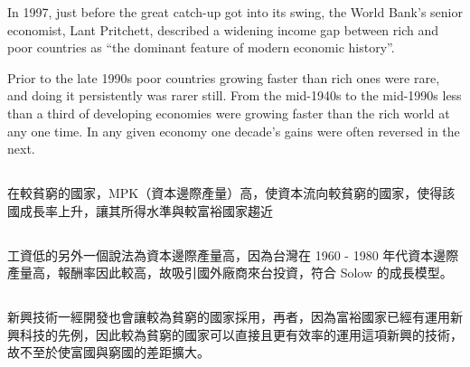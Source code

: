 \documentclass[11pt]{article}
\begin{document}
In 1997, just before the great catch-up got into its swing, the World Bank’s senior economist, Lant Pritchett, described a widening income gap between rich and poor countries as “the dominant feature of modern economic history”. 

Prior to the late 1990s poor countries growing faster than rich ones were rare, and doing it persistently was rarer still. From the mid-1940s to the mid-1990s less than a third of developing economies were growing faster than the rich world at any one time. In any given economy one decade’s gains were often reversed in the next.

\subsection{}
在較貧窮的國家，MPK（資本邊際產量）高，使資本流向較貧窮的國家，使得該國成長率上升，讓其所得水準與較富裕國家趨近

\subsection{}
工資低的另外一個說法為資本邊際產量高，因為台灣在 1960 - 1980 年代資本邊際產量高，報酬率因此較高，故吸引國外廠商來台投資，符合 Solow 的成長模型。

\subsection{}
新興技術一經開發也會讓較為貧窮的國家採用，再者，因為富裕國家已經有運用新興科技的先例，因此較為貧窮的國家可以直接且更有效率的運用這項新興的技術，故不至於使富國與窮國的差距擴大。
\end{document}
